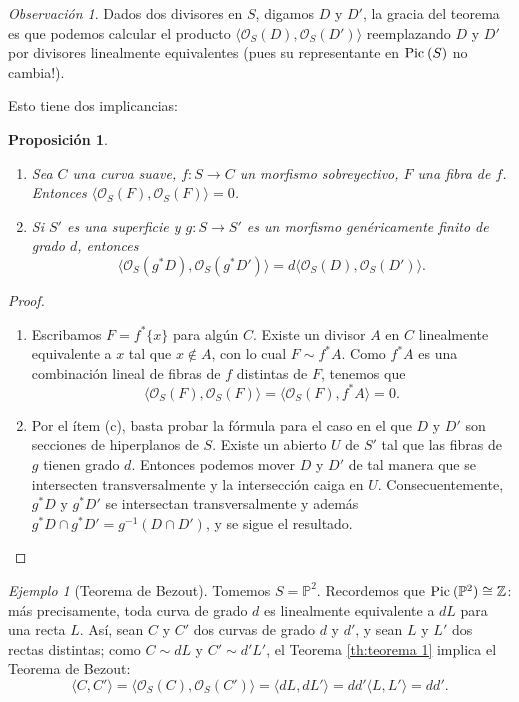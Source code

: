 \documentclass[spanish,12pt]{amsart}
\newcommand{\Pic}[1]{\textup{Pic}{ \: (#1)}}
\newtheorem{proposition}[theorem]{Proposición}
\theoremstyle{definition}
\theoremstyle{remark}
\newtheorem{remark}[theorem]{Observación}
\newtheorem{example}[theorem]{Ejemplo}
\numberwithin{equation}{section}
\newcommand{\integers}{\mathbb{Z}}
\renewcommand{\O}{\mathcal{O}}
\begin{document}
\begin{remark}
Dados dos divisores en $S$, digamos $D$ y $D'$, la gracia del teorema es que podemos calcular el producto $\langle \O_S (D), \O_S (D')\rangle$ reemplazando $D$ y $D'$ por divisores linealmente equivalentes (pues su representante en $\Pic S$ no cambia!).
\end{remark}
Esto tiene dos implicancias:

\begin{proposition}
\begin{enumerate}[(1)]
\item Sea $C$ una curva suave, $f : S \to C$ un morfismo sobreyectivo, $F$ una fibra de $f$. Entonces $\langle \O_S (F), \O_S (F)\rangle  = 0$.
\item Si $S'$ es una superficie y $g : S \to S'$ es un morfismo genéricamente finito de grado $d$, entonces
\[
    \langle \O_S (g^* D), \O_S (g^* D')\rangle  = d \langle  \O_S (D), \O_S (D')\rangle .
\]
\end{enumerate}
\end{proposition}
\begin{proof}
\begin{enumerate}[(1)]
\item Escribamos $F = f^* \{x\}$ para algún $C$. Existe un divisor $A$ en $C$ linealmente equivalente a $x$ tal que $x \not \in A$, con lo cual $F \sim f^* A$. Como $f^* A$ es una combinación lineal de fibras de $f$ distintas de $F$, tenemos que
\[
    \langle \O_S (F), \O_S (F)\rangle  = \langle \O_S (F), f^* A\rangle  = 0.
\]
\item Por el ítem (c), basta probar la fórmula para el caso en el que $D$ y $D'$ son secciones de hiperplanos de $S$. Existe un abierto $U$ de $S'$ tal que las fibras de $g$ tienen grado $d$. Entonces podemos mover $D$ y $D'$ de tal manera que se intersecten transversalmente y la intersección caiga en $U$. Consecuentemente, $g^* D$ y $g^* D'$ se intersectan transversalmente y además $g^* D \cap g^* D' = g^{-1} (D \cap D')$, y se sigue el resultado.
\end{enumerate}
\end{proof}

\begin{example}[Teorema de Bezout]
Tomemos $S = \mathbb{P}^2$. Recordemos que $\Pic {\mathbb{P}^2} \cong \integers$: más precisamente, toda curva de grado $d$ es linealmente equivalente a $d L$ para una recta $L$. Así, sean $C$ y $C'$ dos curvas de grado $d$ y $d'$, y sean $L$ y $L'$ dos rectas distintas; como $C \sim d L$ y $C' \sim d' L'$, el Teorema \ref{th:teorema 1} implica el Teorema de Bezout:
\[
    \langle C, C' \rangle  = \langle \O_S (C), \O_S (C')\rangle  = \langle d L, d L' \rangle = d d' \langle L, L'\rangle  = d d'.
\]
\end{example}
\end{document}
